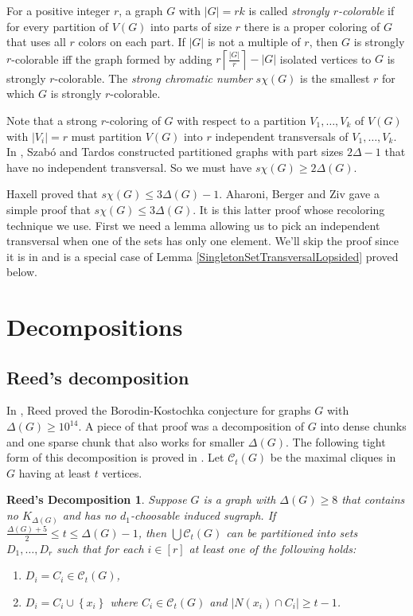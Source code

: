 \documentclass[12pt]{article}
\theoremstyle{plain}
\newtheorem*{ReedDecomp}{Reed's Decomposition}
\theoremstyle{definition}
\theoremstyle{remark}
\newcommand{\fancy}[1]{\mathcal{#1}}
\newcommand{\CC}{\fancy{C}}
\newcommand{\set}[1]{\left\{ #1 \right\}}
\newcommand{\card}[1]{\left|#1\right|}
\newcommand{\ceil}[1]{\left\lceil#1\right\rceil}
\newcommand{\irange}[1]{\left[#1\right]}
\begin{document}
For a positive integer $r$, a graph $G$ with $\card{G} = rk$ is called \emph{strongly $r$-colorable} if for every partition of $V(G)$ into parts of size $r$ there is a proper coloring of $G$ that uses all $r$ colors on each part.  If $\card{G}$ is not a multiple of $r$, then $G$ is strongly $r$-colorable iff the graph formed by adding $r\ceil{\frac{|G|}{r}} - |G|$ isolated vertices to $G$ is strongly $r$-colorable.  
The \emph{strong chromatic number} $s\chi(G)$ is the smallest $r$ for which $G$ is strongly $r$-colorable.

Note that a strong $r$-coloring of $G$ with respect to a partition $V_1, \ldots, V_k$ of $V(G)$ with $\card{V_i} = r$ must partition $V(G)$ into $r$ 
independent transversals of $V_1, \ldots, V_k$. In \cite{szabo2006extremal}, Szab{\'o} and Tardos constructed partitioned graphs with part sizes $2\Delta - 1$ 
that have no independent transversal.  So we must have $s\chi(G) \geq 2\Delta(G)$.  

Haxell \cite{haxell2004strong} proved that $s\chi(G) \leq 3\Delta(G) - 1$.  
Aharoni, Berger and Ziv \cite{aharoni2007independent} gave a simple proof that $s\chi(G) \leq 3\Delta(G)$.  
It is this latter proof whose recoloring technique we use.  First we need a lemma allowing us to pick an independent transversal 
when one of the sets has only one element.  We'll skip the proof since it is in \cite{aharoni2007independent} 
and is a special case of Lemma \ref{SingletonSetTransversalLopsided} proved below.

\section{Decompositions}
\subsection{Reed's decomposition}
In \cite{reed1999strengthening}, Reed proved the Borodin-Kostochka conjecture for graphs $G$ with $\Delta(G) \ge 10^{14}$.  A piece of that proof was a decomposition of $G$
into dense chunks and one sparse chunk that also works for smaller $\Delta(G)$.  The following tight form of this decomposition is proved in \cite{denseneighborhoods}.
Let $\CC_t(G)$ be the maximal cliques in $G$ having at least $t$ vertices.

\begin{ReedDecomp}
Suppose $G$ is a graph with $\Delta(G) \ge 8$ that contains no $K_{\Delta(G)}$ and has no $d_1$-choosable induced sugraph. If
$\frac{\Delta(G) + 5}{2} \le t \le \Delta(G) - 1$, then $\bigcup \CC_t(G)$ can be
partitioned into sets $D_1, \ldots, D_r$ such that for each $i \in \irange{r}$
at least one of the following holds:
\begin{enumerate}
  \item $D_i = C_i \in \CC_t(G)$,
  \item $D_i = C_i \cup \set{x_i}$ where $C_i \in \CC_t(G)$ and $\card{N(x_i) \cap C_i} \geq t-1$.
\end{enumerate}
\end{ReedDecomp}
\end{document}
